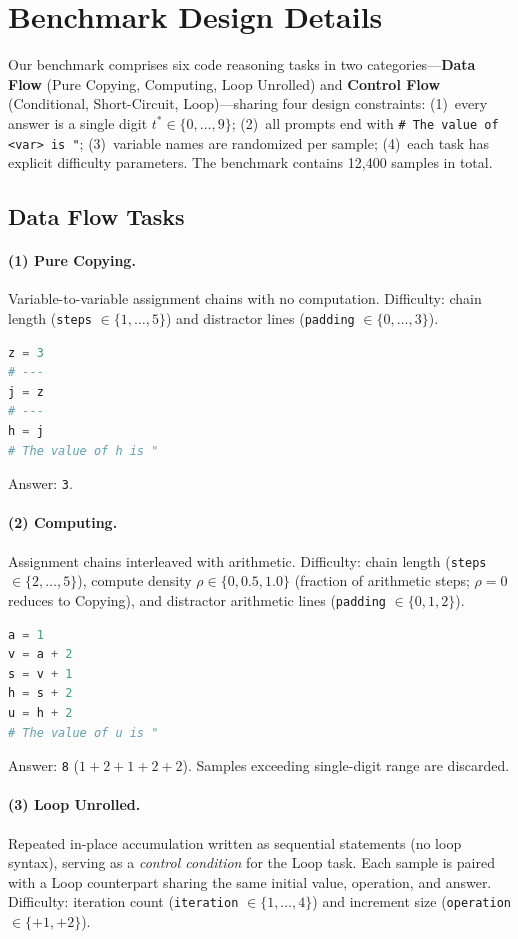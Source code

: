 \section{Benchmark Design Details}
\label{app:benchmark_design_details}

Our benchmark comprises six code reasoning tasks in two categories---\textbf{Data Flow} (Pure Copying, Computing, Loop Unrolled) and \textbf{Control Flow} (Conditional, Short-Circuit, Loop)---sharing four design constraints:
(1)~every answer is a single digit $t^* \in \{0,\dots,9\}$;
(2)~all prompts end with \texttt{\# The value of <var> is "};
(3)~variable names are randomized per sample;
(4)~each task has explicit difficulty parameters.
The benchmark contains 12,400 samples in total.

\subsection{Data Flow Tasks}
\label{app:subsec:data_flow}

\paragraph{(1) Pure Copying.}
Variable-to-variable assignment chains with no computation. Difficulty: chain length (\texttt{steps} $\in\{1,\dots,5\}$) and distractor lines (\texttt{padding} $\in\{0,\dots,3\}$).

\begin{lstlisting}[language=Python]
z = 3
# ---
j = z
# ---
h = j
# The value of h is "
\end{lstlisting}
\noindent Answer: \texttt{3}.

\paragraph{(2) Computing.}
Assignment chains interleaved with arithmetic. Difficulty: chain length (\texttt{steps} $\in\{2,\dots,5\}$), compute density $\rho \in \{0, 0.5, 1.0\}$ (fraction of arithmetic steps; $\rho{=}0$ reduces to Copying), and distractor arithmetic lines (\texttt{padding} $\in\{0,1,2\}$).

\begin{lstlisting}[language=Python]
a = 1
v = a + 2
s = v + 1
h = s + 2
u = h + 2
# The value of u is "
\end{lstlisting}
\noindent Answer: \texttt{8} ($1+2+1+2+2$). Samples exceeding single-digit range are discarded.

\paragraph{(3) Loop Unrolled.}
Repeated in-place accumulation written as sequential statements (no loop syntax), serving as a \emph{control condition} for the Loop task. Each sample is paired with a Loop counterpart sharing the same initial value, operation, and answer.
Difficulty: iteration count (\texttt{iteration} $\in\{1,\dots,4\}$) and increment size (\texttt{operation} $\in\{+1, +2\}$).

